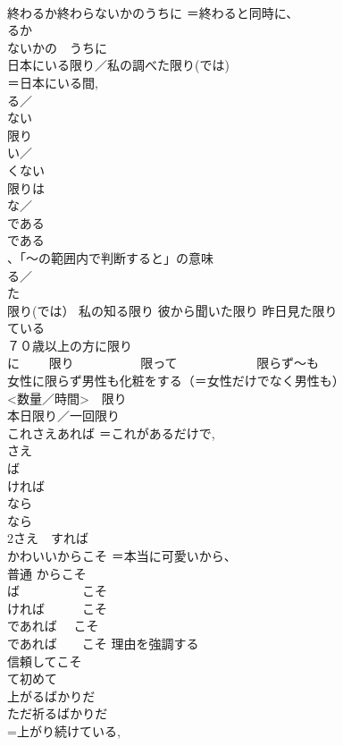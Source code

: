 \documentclass[8pt]{extreport}
\begin{document}
\begin{CJK}{UTF8}{min}
\\	終わるか終わらないかのうちに	＝終わると同時に、
\\	るか　
\\	ないかの　うちに
\\	日本にいる限り／私の調べた限り(では)	
\\	＝日本にいる間, 
\\	る／
\\	ない　　　　　
\\	限り 　　
\\	い／
\\	くない　　　　
\\	限りは 　　
\\	な／
\\	である　　　
\\	である　　　　　　 
\\	、「〜の範囲内で判断すると」の意味 　　
\\	る／
\\	た　
\\	限り(では） 私の知る限り 彼から聞いた限り 昨日見た限り 　　
\\	ている　 
\\	７０歳以上の方に限り	
\\	に　 　限り 　　　　　限って　 　　　　　限らず〜も 
\\	女性に限らず男性も化粧をする（＝女性だけでなく男性も） 
\\	<数量／時間>　限り 
\\	本日限り／一回限り
\\	これさえあれば	＝これがあるだけで, 
\\	さえ　　
\\	ば 　　　　 
\\	ければ 
\\	なら 
\\	なら 
\\	2さえ　すれば
\\	かわいいからこそ	＝本当に可愛いから、
\\	普通 からこそ 
\\	ば　　　　　こそ 
\\	ければ　　　こそ 
\\	であれば　 こそ 
\\	であれば　　こそ 理由を強調する
\\	信頼してこそ	
\\	て初めて 
\\	上がるばかりだ 
\\	ただ祈るばかりだ	
\\	=上がり続けている, 

\end{CJK}
\end{document}
